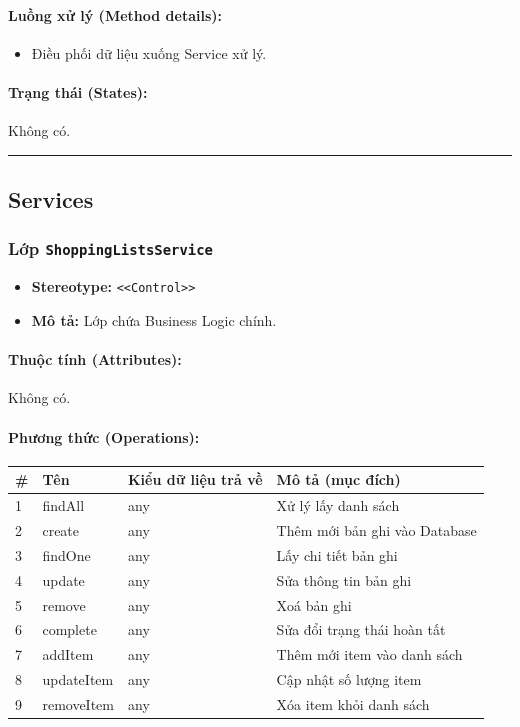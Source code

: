 \documentclass[12pt,a4paper]{article}
\begin{document}
\paragraph{Luồng xử lý (Method details):}
\begin{itemize}[leftmargin=*]
    \item Điều phối dữ liệu xuống Service xử lý.
\end{itemize}


\paragraph{Trạng thái (States):}
Không có.

\vskip 0.5cm
\noindent\rule{\textwidth}{0.5pt}
\vskip 0.5cm

\subsection{Services}


\subsubsection{Lớp \texttt{ShoppingListsService}}

\begin{itemize}[leftmargin=*]
    \item \textbf{Stereotype:} \texttt{\textless{}\textless{}Control\textgreater{}\textgreater{}}
    \item \textbf{Mô tả:} Lớp chứa Business Logic chính.
\end{itemize}

\paragraph{Thuộc tính (Attributes):}
Không có.

\paragraph{Phương thức (Operations):}
\begin{longtable}{|p{0.6cm}|p{5.0cm}|p{2.8cm}|p{5.4cm}|}
\hline
\textbf{\#} & \textbf{Tên} & \textbf{Kiểu dữ liệu trả về} & \textbf{Mô tả (mục đích)} \\ \hline
\endhead
1 & findAll & any & Xử lý lấy danh sách \\ \hline
2 & create & any & Thêm mới bản ghi vào Database \\ \hline
3 & findOne & any & Lấy chi tiết bản ghi \\ \hline
4 & update & any & Sửa thông tin bản ghi \\ \hline
5 & remove & any & Xoá bản ghi \\ \hline
6 & complete & any & Sửa đổi trạng thái hoàn tất \\ \hline
7 & addItem & any & Thêm mới item vào danh sách \\ \hline
8 & updateItem & any & Cập nhật số lượng item \\ \hline
9 & removeItem & any & Xóa item khỏi danh sách \\ \hline
\end{longtable}
\end{document}
